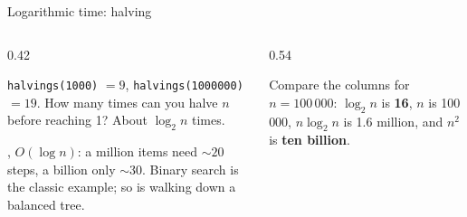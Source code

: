 \documentclass[aspectratio=169,10pt]{beamer}
\newcommand{\pyouts}[2]{}
\begin{document}
\begin{frame}{Logarithmic time: halving}
\begin{columns}[T]
\begin{column}{0.42\textwidth}
\vspace{2mm}
{\small
\texttt{halvings(1000)} $=9$, \texttt{halvings(1000000)} $=19$. How many times can you halve $n$ before reaching 1? About $\log_2 n$ times.

\vspace{2mm}
, $O(\log n)$: a million items need ${\sim}20$ steps, a billion only ${\sim}30$. Binary search is the classic example; so is walking down a balanced tree.}
\end{column}
\begin{column}{0.54\textwidth}
\pyouts{\fontsize{7.2}{8.6}}{steps}
\vspace{2mm}
{\small Compare the columns for $n=100\,000$: $\log_2 n$ is \textbf{16}, $n$ is 100\,000, $n\log_2 n$ is 1.6 million, and $n^2$ is \textbf{ten billion}.}
\end{column}
\end{columns}
\end{frame}
\end{document}
